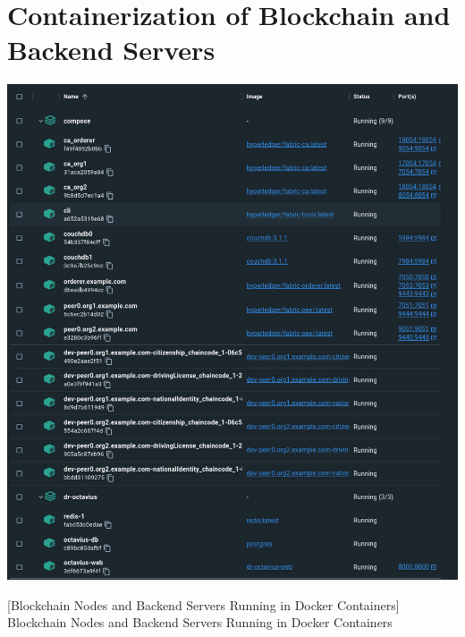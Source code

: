 
\section{Containerization of Blockchain and Backend Servers}
\vspace{10pt}
\includegraphics[width=1 \linewidth]{images/appendix/Docker.png}

\setcounter{figure}{0}  

[Blockchain Nodes and Backend Servers Running in Docker Containers]{
Blockchain Nodes and Backend Servers Running in Docker Containers
}

 \newpage


